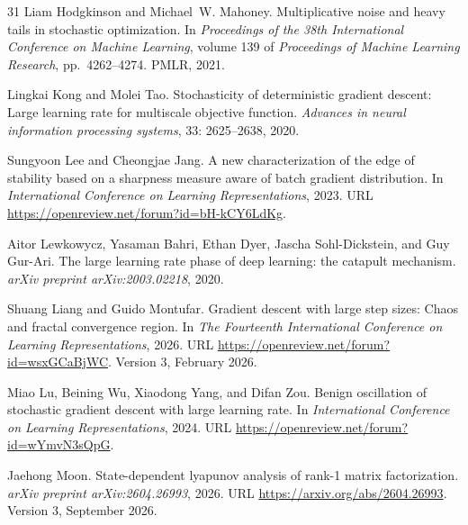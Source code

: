 \documentclass[11pt]{article}
\begin{document}
\begin{thebibliography}{31}
Liam Hodgkinson and Michael~W. Mahoney.
\newblock Multiplicative noise and heavy tails in stochastic optimization.
\newblock In \emph{Proceedings of the 38th International Conference on Machine
  Learning}, volume 139 of \emph{Proceedings of Machine Learning Research},
  pp.\  4262--4274. PMLR, 2021.

Lingkai Kong and Molei Tao.
\newblock Stochasticity of deterministic gradient descent: Large learning rate
  for multiscale objective function.
\newblock \emph{Advances in neural information processing systems},
  33: 2625--2638, 2020.

Sungyoon Lee and Cheongjae Jang.
\newblock A new characterization of the edge of stability based on a sharpness
  measure aware of batch gradient distribution.
\newblock In \emph{International Conference on Learning Representations}, 2023.
\newblock URL \url{https://openreview.net/forum?id=bH-kCY6LdKg}.

Aitor Lewkowycz, Yasaman Bahri, Ethan Dyer, Jascha Sohl-Dickstein, and Guy
  Gur-Ari.
\newblock The large learning rate phase of deep learning: the catapult
  mechanism.
\newblock \emph{arXiv preprint arXiv:2003.02218}, 2020.

Shuang Liang and Guido Montufar.
\newblock Gradient descent with large step sizes: Chaos and fractal convergence
  region.
\newblock In \emph{The Fourteenth International Conference on Learning
  Representations}, 2026.
\newblock URL \url{https://openreview.net/forum?id=wsxGCaBjWC}.
\newblock Version 3, February 2026.

Miao Lu, Beining Wu, Xiaodong Yang, and Difan Zou.
\newblock Benign oscillation of stochastic gradient descent with large learning
  rate.
\newblock In \emph{International Conference on Learning Representations}, 2024.
\newblock URL \url{https://openreview.net/forum?id=wYmvN3sQpG}.

Jaehong Moon.
\newblock State-dependent lyapunov analysis of rank-1 matrix factorization.
\newblock \emph{arXiv preprint arXiv:2604.26993}, 2026.
\newblock URL \url{https://arxiv.org/abs/2604.26993}.
\newblock Version 3, September 2026.


\end{thebibliography}
\end{document}

